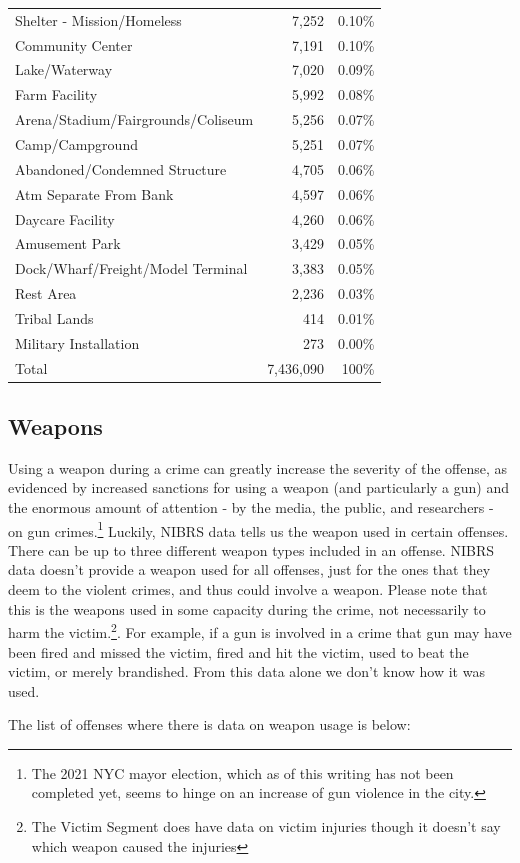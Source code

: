 \documentclass[
  12pt,
  openany]{book}
\begin{document}
\begin{longtable}[]{@{}lrr@{}}
Shelter - Mission/Homeless & 7,252 & 0.10\%\tabularnewline
Community Center & 7,191 & 0.10\%\tabularnewline
Lake/Waterway & 7,020 & 0.09\%\tabularnewline
Farm Facility & 5,992 & 0.08\%\tabularnewline
Arena/Stadium/Fairgrounds/Coliseum & 5,256 & 0.07\%\tabularnewline
Camp/Campground & 5,251 & 0.07\%\tabularnewline
Abandoned/Condemned Structure & 4,705 & 0.06\%\tabularnewline
Atm Separate From Bank & 4,597 & 0.06\%\tabularnewline
Daycare Facility & 4,260 & 0.06\%\tabularnewline
Amusement Park & 3,429 & 0.05\%\tabularnewline
Dock/Wharf/Freight/Model Terminal & 3,383 & 0.05\%\tabularnewline
Rest Area & 2,236 & 0.03\%\tabularnewline
Tribal Lands & 414 & 0.01\%\tabularnewline
Military Installation & 273 & 0.00\%\tabularnewline
Total & 7,436,090 & 100\%\tabularnewline
\bottomrule
\end{longtable}

\hypertarget{offenseWeapons}{%
\subsection{Weapons}\label{offenseWeapons}}

Using a weapon during a crime can greatly increase the severity of the offense, as evidenced by increased sanctions for using a weapon (and particularly a gun) and the enormous amount of attention - by the media, the public, and researchers - on gun crimes.\footnote{The 2021 NYC mayor election, which as of this writing has not been completed yet, seems to hinge on an increase of gun violence in the city.} Luckily, NIBRS data tells us the weapon used in certain offenses. There can be up to three different weapon types included in an offense. NIBRS data doesn't provide a weapon used for all offenses, just for the ones that they deem to the violent crimes, and thus could involve a weapon. Please note that this is the weapons used in some capacity during the crime, not necessarily to harm the victim.\footnote{The Victim Segment does have data on victim injuries though it doesn't say which weapon caused the injuries}. For example, if a gun is involved in a crime that gun may have been fired and missed the victim, fired and hit the victim, used to beat the victim, or merely brandished. From this data alone we don't know how it was used.

The list of offenses where there is data on weapon usage is below:
\end{document}
